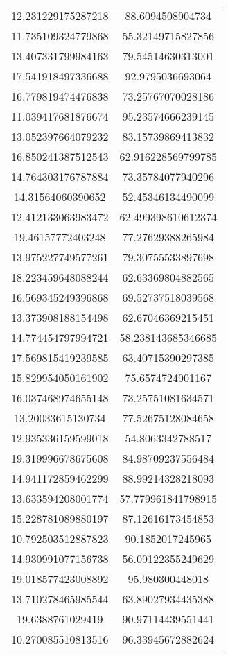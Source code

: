 \begin{table}
\begin{tabular}{cc}
12.231229175287218 & 88.6094508904734 \\
11.735109324779868 & 55.32149715827856 \\
13.407331799984163 & 79.54514630313001 \\
17.541918497336688 & 92.9795036693064 \\
16.779819474476838 & 73.25767070028186 \\
11.039417681876674 & 95.23574666239145 \\
13.052397664079232 & 83.15739869413832 \\
16.850241387512543 & 62.916228569799785 \\
14.764303176787884 & 73.35784077940296 \\
14.31564060390652 & 52.45346134490099 \\
12.412133063983472 & 62.499398610612374 \\
19.46157772403248 & 77.27629388265984 \\
13.975227749577261 & 79.30755533897698 \\
18.223459648088244 & 62.63369804882565 \\
16.569345249396868 & 69.52737518039568 \\
13.373908188154498 & 62.67046369215451 \\
14.774454797994721 & 58.238143685346685 \\
17.569815419239585 & 63.40715390297385 \\
15.829954050161902 & 75.6574724901167 \\
16.037468974655148 & 73.25751081634571 \\
13.20033615130734 & 77.52675128084658 \\
12.935336159599018 & 54.8063342788517 \\
19.319996678675608 & 84.98709237556484 \\
14.941172859462299 & 88.99214328218093 \\
13.633594208001774 & 57.779961841798915 \\
15.228781089880197 & 87.12616173454853 \\
10.792503512887823 & 90.1852017245965 \\
14.930991077156738 & 56.09122355249629 \\
19.018577423008892 & 95.980300448018 \\
13.710278465985544 & 63.89027934435388 \\
19.6388761029419 & 90.97114439551441 \\
10.270085510813516 & 96.33945672882624 \\

\end{tabular}
\end{table}
